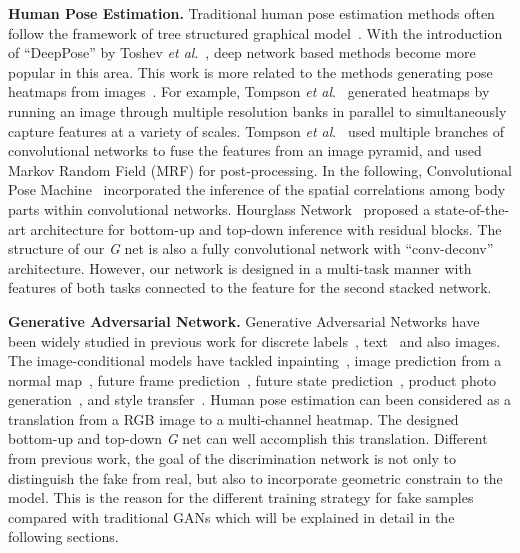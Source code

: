 \documentclass[10pt,letterpaper,twocolumn]{article}
\begin{document}
\textbf{Human Pose Estimation.} Traditional human pose estimation methods often follow the framework of tree structured graphical model~\cite{journals/ijcv/EichnerMZF12,journals/ijcv/BuehlerEHZ11,conf/eccv/SappTT10,conf/cvpr/YangR11,conf/iccv/PishchulinAGS13,conf/cvpr/SappT13}. With the introduction of ``DeepPose'' by Toshev \emph{et al}.~\cite{conf/cvpr/ToshevS14}, deep network based methods become more popular in this area. This work is more related to the methods generating pose heatmaps from images~\cite{conf/cvpr/YangOLW16,conf/eccv/NewellYD16,conf/cvpr/TompsonGJLB15,conf/cvpr/WeiRKS16,conf/cvpr/ChuOLW16,conf/cvpr/PishchulinITAAG16,conf/eccv/InsafutdinovPAA16,conf/nips/TompsonJLB14}. For example, Tompson \emph{et al}.~\cite{conf/nips/TompsonJLB14} generated heatmaps by running an image through multiple resolution banks in parallel to simultaneously capture features at a variety of scales. Tompson \emph{et al}.~\cite{conf/cvpr/TompsonGJLB15} used multiple branches of convolutional networks to fuse the features from an image pyramid, and used Markov Random Field (MRF) for post-processing. In the following, Convolutional Pose Machine~\cite{conf/cvpr/WeiRKS16} incorporated the inference of the spatial correlations among body parts within convolutional networks. Hourglass Network~\cite{conf/eccv/NewellYD16} 
proposed a state-of-the-art architecture for bottom-up and top-down inference with residual blocks. The structure of our \textit{G} net is also a fully convolutional network with ``conv-deconv'' architecture. However, our network is designed in a multi-task manner with features of both tasks connected to the feature for the second stacked network.

{\bf Generative Adversarial Network.} Generative Adversarial Networks have been widely studied in previous work for discrete labels~\cite{journals/corr/MirzaO14}, text~\cite{reed2016generative} and also images. The image-conditional models have tackled inpainting~\cite{conf/cvpr/PathakKDDE16}, image prediction from a normal map~\cite{conf/eccv/WangG16}, future frame prediction~\cite{journals/corr/MathieuCL15}, future state prediction~\cite{conf/eccv/ZhouB16}, product photo generation~\cite{conf/eccv/YooKPPK16}, and style transfer~\cite{conf/eccv/LifshitzFU16}. Human pose estimation can been considered as a translation from a RGB image to a multi-channel heatmap. The designed bottom-up and top-down \textit{G} net can well accomplish this translation. Different from previous work, the goal of the discrimination network is not only to distinguish the fake from real, but also to incorporate geometric constrain to the model. This is the reason for the different training strategy for fake samples compared with traditional GANs which will be explained in detail in
the following sections.
\end{document}
